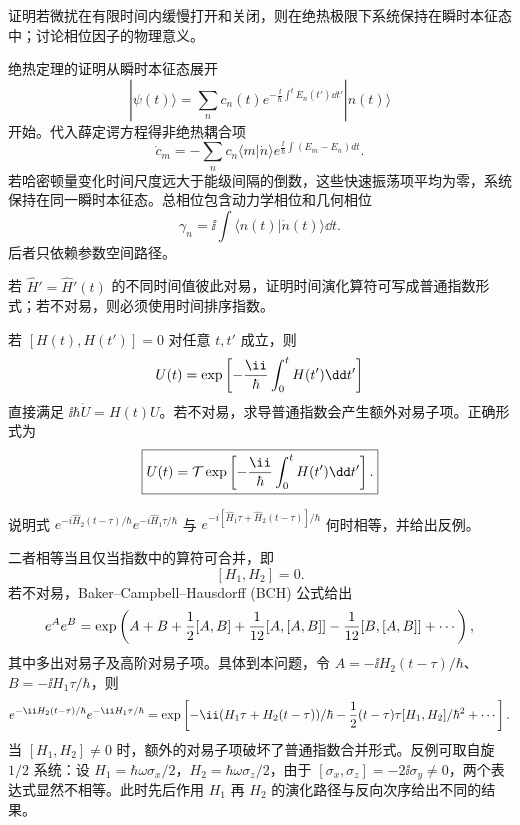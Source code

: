 \begin{question}
证明若微扰在有限时间内缓慢打开和关闭，则在绝热极限下系统保持在瞬时本征态中；讨论相位因子的物理意义。
\end{question}
\begin{solution}
绝热定理的证明从瞬时本征态展开
\[
|\psi(t)\rangle=\sum_n c_n(t)e^{-\frac{\ii}{\hbar}\int^t E_n(t')\dd t'}|n(t)\rangle
\]
开始。代入薛定谔方程得非绝热耦合项
\[
\dot c_m=-\sum_n c_n\langle m|\dot n\rangle e^{\frac{\ii}{\hbar}\int(E_m-E_n)dt}.
\]
若哈密顿量变化时间尺度远大于能级间隔的倒数，这些快速振荡项平均为零，系统保持在同一瞬时本征态。总相位包含动力学相位和几何相位
\[
\gamma_n=\ii\int\langle n(t)|\dot n(t)\rangle\dd t.
\]
后者只依赖参数空间路径。
\end{solution}

\begin{question}
若 $\hat H'=\hat H'(t)$ 的不同时间值彼此对易，证明时间演化算符可写成普通指数形式；若不对易，则必须使用时间排序指数。
\end{question}
\begin{solution}
若 $[H(t),H(t')]=0$ 对任意 $t,t'$ 成立，则
\[
U(t)=\exp\left[-{\ii\over\hbar}\int_0^t H(t')\dd t'\right]
\]
直接满足 $\ii\hbar\dot U=H(t)U$。若不对易，求导普通指数会产生额外对易子项。正确形式为
\[
\boxed{U(t)=\mathcal T\exp\left[-{\ii\over\hbar}\int_0^t H(t')\dd t'\right].}
\]
\end{solution}

\begin{question}
说明式 $e^{-i\hat H_2(t-\tau)/\hbar}e^{-i\hat H_1\tau/\hbar}$ 与 $e^{-i[\hat H_1\tau+\hat H_2(t-\tau)]/\hbar}$ 何时相等，并给出反例。
\end{question}
\begin{solution}
二者相等当且仅当指数中的算符可合并，即
\[
[H_1,H_2]=0.
\]
若不对易，Baker--Campbell--Hausdorff (BCH) 公式给出
\[
e^Ae^B=\exp\left(A+B+{1\over2}[A,B]+{1\over12}[A,[A,B]]-{1\over12}[B,[A,B]]+\cdots\right),
\]
其中多出对易子及高阶对易子项。具体到本问题，令 $A=-\ii H_2(t-\tau)/\hbar$、$B=-\ii H_1\tau/\hbar$，则
\[
e^{-\ii H_2(t-\tau)/\hbar}e^{-\ii H_1\tau/\hbar}
=\exp\left[-\ii(H_1\tau+H_2(t-\tau))/\hbar
-{1\over2}(t-\tau)\tau[H_1,H_2]/\hbar^2+\cdots\right].
\]
当 $[H_1,H_2]\neq0$ 时，额外的对易子项破坏了普通指数合并形式。反例可取自旋 $1/2$ 系统：设 $H_1=\hbar\omega\sigma_x/2$，$H_2=\hbar\omega\sigma_z/2$，由于 $[\sigma_x,\sigma_z]=-2\ii\sigma_y\neq0$，两个表达式显然不相等。此时先后作用 $H_1$ 再 $H_2$ 的演化路径与反向次序给出不同的结果。
\end{solution}

